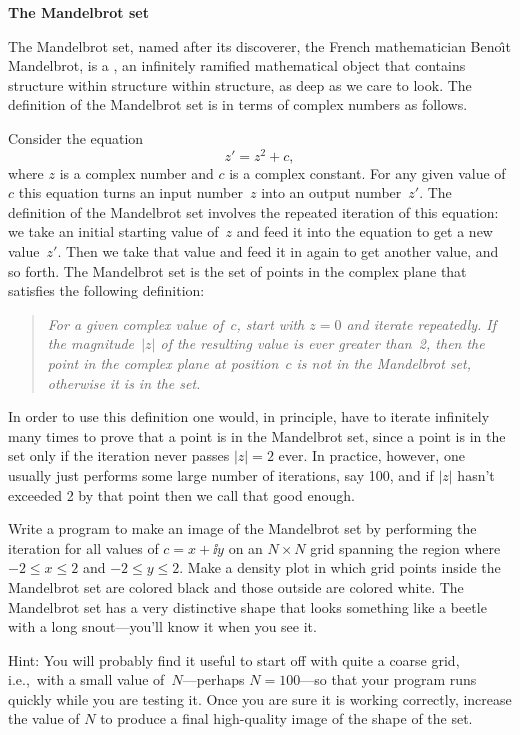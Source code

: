\documentclass[12pt]{article}
\begin{document}
\begin{exercises}
\exercise \textbf{The Mandelbrot set}

\exskip The Mandelbrot set, named after its discoverer, the French
mathematician Beno\^{\i}t Mandelbrot, is a , an infinitely
ramified mathematical object that contains structure within structure
within structure, as deep as we care to look.  The definition of the
Mandelbrot set is in terms of complex numbers as follows.

Consider the equation
\begin{displaymath}
z' = z^2 + c,
\end{displaymath}
where $z$ is a complex number and $c$ is a complex constant.  For any given
value of $c$ this equation turns an input number~$z$ into an output
number~$z'$.  The definition of the Mandelbrot set involves the repeated
iteration of this equation: we take an initial starting value of~$z$ and
feed it into the equation to get a new value~$z'$.  Then we take that value
and feed it in again to get another value, and so forth.  The Mandelbrot
set is the set of points in the complex plane that satisfies the following
definition:
\begin{quote}
\it For a given complex value of~$c$, start with $z=0$ and iterate
repeatedly.  If the magnitude~$|z|$ of the resulting value is ever greater
than~2, then the point in the complex plane at position~$c$ is \emph{not}
in the Mandelbrot set, otherwise it is in the set.
\end{quote}
In order to use this definition one would, in principle, have to iterate
infinitely many times to prove that a point is in the Mandelbrot set, since
a point is in the set only if the iteration never passes $|z|=2$ ever.  In
practice, however, one usually just performs some large number of
iterations, say 100, and if $|z|$ hasn't exceeded 2 by that point then we
call that good enough.

Write a program to make an image of the Mandelbrot set by performing the
iteration for all values of $c=x+\ii y$ on an $N\times N$ grid spanning the
region where $-2\le x\le 2$ and $-2\le y\le 2$.  Make a density plot in
which grid points inside the Mandelbrot set are colored black and those
outside are colored white.  The Mandelbrot set has a very distinctive shape
that looks something like a beetle with a long snout---you'll know it when
you see it.

Hint: You will probably find it useful to start off with quite a coarse
grid, i.e.,~with a small value of~$N$---perhaps $N=100$---so that your
program runs quickly while you are testing it.  Once you are sure it is
working correctly, increase the value of $N$ to produce a final
high-quality image of the shape of the set.


\end{exercises}
\end{document}
